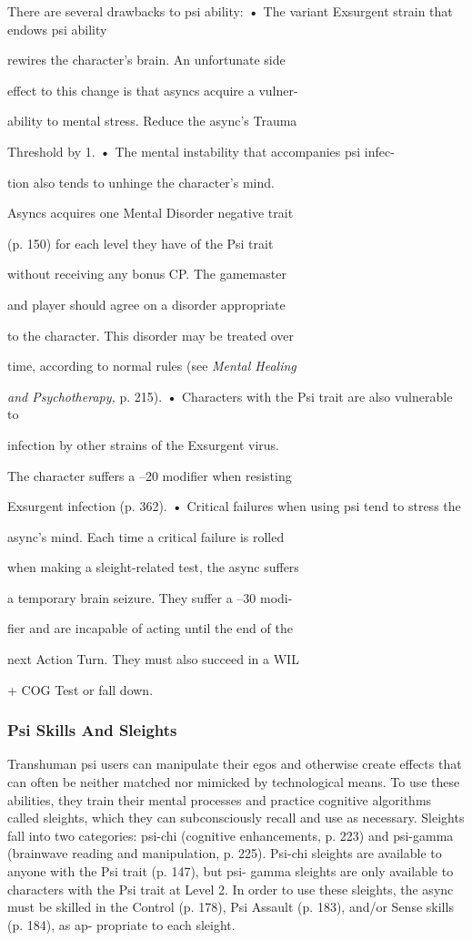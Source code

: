 There are several drawbacks to psi ability:
\textbf{•  }The variant Exsurgent strain that endows psi ability 

rewires the character's brain. An unfortunate side 

effect to this change is that asyncs acquire a vulner-

ability to mental stress. Reduce the async's Trauma 

Threshold by 1.
\textbf{•  }The mental instability that accompanies psi infec-

tion also tends to unhinge the character's mind. 

Asyncs acquires one Mental Disorder negative trait 

(p. 150) for each level they have of the Psi trait 

without receiving any bonus CP. The gamemaster 

and player should agree on a disorder appropriate 

to the character. This disorder may be treated over 

time, according to normal rules (see\textit{ Mental Healing }

\textit{and Psychotherapy, }p. 215).
\textbf{•  }Characters with the Psi trait are also vulnerable to 

infection by other strains of the Exsurgent virus. 

The character suffers a –20 modifier when resisting 

Exsurgent infection (p. 362).
\textbf{•  }Critical failures when using psi tend to stress the 

async's mind. Each time a critical failure is rolled 

when making a sleight-related test, the async suffers 

a temporary brain seizure. They suffer a –30 modi-

fier and are incapable of acting until the end of the 

next Action Turn. They must also succeed in a WIL 

+ COG Test or fall down.

\subsubsection{Psi Skills And Sleights}

Transhuman psi users can manipulate their egos and 
otherwise create effects that can often be neither 
matched nor mimicked by technological means. To use 
these abilities, they train their mental processes and 
practice cognitive algorithms called sleights, which 
they can subconsciously recall and use as necessary. 
Sleights fall into two categories: psi-chi (cognitive 
enhancements, p. 223) and psi-gamma (brainwave 
reading and manipulation, p. 225). Psi-chi sleights are 
available to anyone with the Psi trait (p. 147), but psi-
gamma sleights are only available to characters with 
the Psi trait at Level 2. In order to use these sleights, 
the async must be skilled in the Control (p. 178), Psi 
Assault (p. 183), and/or Sense skills (p. 184), as ap-
propriate to each sleight.

